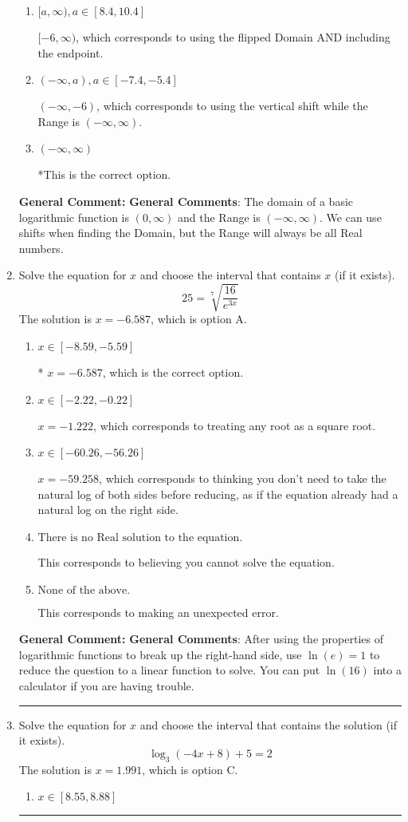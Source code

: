 \documentclass{extbook}[14pt]
\newcommand{\litem}[1]{\item #1

\rule{\textwidth}{0.4pt}}
\begin{document}
\begin{enumerate}
{\begin{enumerate}[label=\Alph*.]
$(-\infty, 6)$, which corresponds to using the using the negative of vertical shift on $(0, \infty)$.
\item \( [a, \infty), a \in [8.4, 10.4] \)

$[-6, \infty)$, which corresponds to using the flipped Domain AND including the endpoint.
\item \( (-\infty, a), a \in [-7.4, -5.4] \)

$(-\infty, -6)$, which corresponds to using the vertical shift while the Range is $(-\infty, \infty)$.
\item \( (-\infty, \infty) \)

*This is the correct option.
\end{enumerate}

\textbf{General Comment:} \textbf{General Comments}: The domain of a basic logarithmic function is $(0, \infty)$ and the Range is $(-\infty, \infty)$. We can use shifts when finding the Domain, but the Range will always be all Real numbers.
}
\litem{
 Solve the equation for $x$ and choose the interval that contains $x$ (if it exists).
\[  25 = \sqrt[7]{\frac{16}{e^{3x}}} \]
The solution is \( x = -6.587 \), which is option A.\begin{enumerate}[label=\Alph*.]
\item \( x \in [-8.59, -5.59] \)

* $x = -6.587$, which is the correct option.
\item \( x \in [-2.22, -0.22] \)

$x = -1.222$, which corresponds to treating any root as a square root.
\item \( x \in [-60.26, -56.26] \)

$x = -59.258$, which corresponds to thinking you don't need to take the natural log of both sides before reducing, as if the equation already had a natural log on the right side.
\item \( \text{There is no Real solution to the equation.} \)

This corresponds to believing you cannot solve the equation.
\item \( \text{None of the above.} \)

This corresponds to making an unexpected error.
\end{enumerate}

\textbf{General Comment:} \textbf{General Comments}: After using the properties of logarithmic functions to break up the right-hand side, use $\ln(e) = 1$ to reduce the question to a linear function to solve. You can put $\ln(16)$ into a calculator if you are having trouble.
}
\litem{
Solve the equation for $x$ and choose the interval that contains the solution (if it exists).
\[ \log_{3}{(-4x+8)}+5 = 2 \]
The solution is \( x = 1.991 \), which is option C.\begin{enumerate}[label=\Alph*.]
\item \( x \in [8.55, 8.88] \)


\end{enumerate}}
\end{enumerate}
\end{document}

